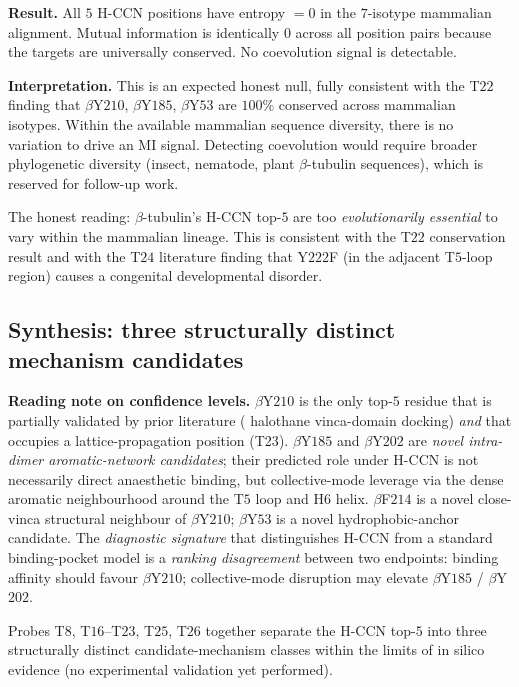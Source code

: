 \documentclass[11pt,a4paper]{article}
\begin{document}
\textbf{Result.} All $5$ H-CCN positions have entropy $= 0$ in the
$7$-isotype mammalian alignment. Mutual information is identically $0$
across all position pairs because the targets are universally
conserved. No coevolution signal is detectable.

\textbf{Interpretation.} This is an expected honest null, fully
consistent with the T$22$ finding that $\beta$Y$210$, $\beta$Y$185$,
$\beta$Y$53$ are $100\%$ conserved across mammalian isotypes. Within
the available mammalian sequence diversity, there is no variation to
drive an MI signal. Detecting coevolution would require broader
phylogenetic diversity (insect, nematode, plant $\beta$-tubulin
sequences), which is reserved for follow-up work.

The honest reading: $\beta$-tubulin's H-CCN top-$5$ are too
\emph{evolutionarily essential} to vary within the mammalian lineage.
This is consistent with the T$22$ conservation result and with the
T$24$ literature finding that Y$222$F (in the adjacent T$5$-loop
region) causes a congenital developmental disorder.

\subsection{Synthesis: three structurally distinct mechanism candidates}\label{ssec:missing_link}

\noindent\textbf{Reading note on confidence levels.}
$\beta$Y$210$ is the only top-$5$ residue that is partially validated by
prior literature (\citet{Craddock2012} halothane vinca-domain docking)
\emph{and} that occupies a lattice-propagation position (\textsf{T23}).
$\beta$Y$185$ and $\beta$Y$202$ are \emph{novel intra-dimer aromatic-network
candidates}; their predicted role under H-CCN is not necessarily direct
anaesthetic binding, but collective-mode leverage via the dense
aromatic neighbourhood around the T$5$ loop and H$6$ helix.
$\beta$F$214$ is a novel close-vinca structural neighbour of $\beta$Y$210$;
$\beta$Y$53$ is a novel hydrophobic-anchor candidate. The \emph{diagnostic
signature} that distinguishes H-CCN from a standard binding-pocket
model is a \emph{ranking disagreement} between two endpoints: binding
affinity should favour $\beta$Y$210$; collective-mode disruption may
elevate $\beta$Y$185$ / $\beta$Y$202$.


Probes T$8$, T$16$--T$23$, T$25$, T$26$ together separate the H-CCN
top-$5$ into three structurally distinct candidate-mechanism classes
within the limits of in silico evidence (no experimental validation
yet performed).
\end{document}
